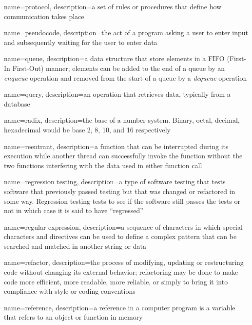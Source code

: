 {
  name=protocol,
  description={a set of rules or procedures that define how communication takes place}
}

{
  name=pseudocode,
  description={the act of a program asking a user to enter input and subsequently waiting for the user to enter data}
}

{
  name=queue,
  description={a data structure that store elements in a FIFO (First-In First-Out) manner; elements can be added to the end of a queue by an \emph{enqueue} operation and removed from the start of a queue by a \emph{dequeue} operation}
}

{
  name=query,
  description={an operation that retrieves data, typically from a database}
}


{
  name=radix,
  description={the base of a number system.  Binary, octal, decimal, hexadecimal would be base 2, 8, 10, and 16 respectively}
}

{
  name=reentrant,
  description={a function that can be interrupted during its execution while another thread can successfully invoke the function without the two functions interfering with the data used in either function call}
}

{
  name=regression testing,
  description={a type of software testing that tests software that previously passed testing but that was changed or refactored in some way.  Regression testing tests to see if the software still passes the tests or not in which case it is said to have ``regressed''}
}

{
  name=regular expression,
  description={a sequence of characters in which special characters and directives can be used to define a complex pattern that can be searched and matched in another string or data}
}

{
  name=refactor,
  description={the process of modifying, updating or restructuring code without changing its external behavior; refactoring may be done to make code more efficient, more readable, more reliable, or simply to bring it into compliance with style or coding conventions}
}

{
  name=reference,
  description={a reference in a computer program is a variable that refers to an object or function in memory}
}

